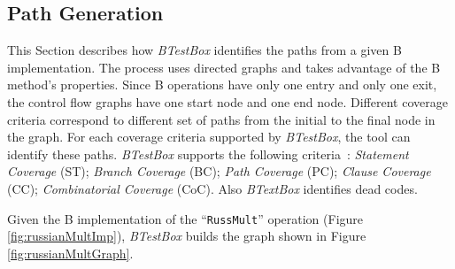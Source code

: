 \documentclass[runningheads]{llncs}
\begin{document}
\subsection{Path Generation}

This Section describes how \textit{BTestBox} identifies the paths from a given B implementation. 
The process uses directed graphs and takes advantage of the B method's properties. Since B operations have only one entry 
and only one exit, the control flow graphs have one start node and one end node. Different coverage criteria correspond
to different set of paths from the initial to the final node in the graph.
For each coverage criteria supported by \textit{BTestBox}, the tool can identify these paths. \textit{BTestBox} supports the following criteria~\cite{ammann2008introduction}:
\textit{Statement Coverage} (ST); 
\textit{Branch Coverage} (BC);
\textit{Path Coverage} (PC);
\textit{Clause Coverage} (CC);
\textit{Combinatorial Coverage} (CoC).
Also \textit{BTextBox} identifies dead codes. 

Given the B implementation of the ``\texttt{RussMult}'' operation (Figure \ref{fig:russianMultImp}), \textit{BTestBox} builds the graph shown in Figure \ref{fig:russianMultGraph}.
        
\end{document}
